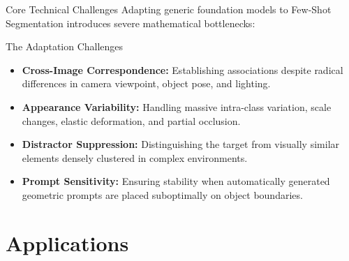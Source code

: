 \documentclass[aspectratio=169, 10pt]{beamer}
\begin{document}
\begin{frame}{Core Technical Challenges}
    Adapting generic foundation models to Few-Shot Segmentation introduces severe mathematical bottlenecks:
    
    \begin{alertblock}{The Adaptation Challenges}
        \begin{itemize}
            \item \textbf{Cross-Image Correspondence:} Establishing associations despite radical differences in camera viewpoint, object pose, and lighting.
            \item \textbf{Appearance Variability:} Handling massive intra-class variation, scale changes, elastic deformation, and partial occlusion.
            \item \textbf{Distractor Suppression:} Distinguishing the target from visually similar elements densely clustered in complex environments.
            \item \textbf{Prompt Sensitivity:} Ensuring stability when automatically generated geometric prompts are placed suboptimally on object boundaries.
        \end{itemize}
    \end{alertblock}
\end{frame}

\section{Applications}
\end{document}
